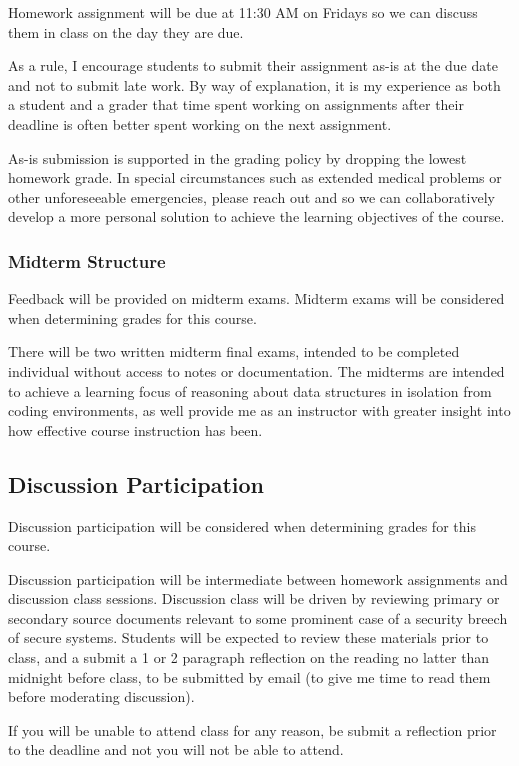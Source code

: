 \documentclass[11pt]{article}
\begin{document}
Homework assignment will be due at 11:30 AM on Fridays so we can discuss them in class on the 
day they are due.

As a rule, I encourage students to submit their assignment as-is at the due date and not to
submit late work. By way of explanation, it is my experience as both a student and a grader that time spent working on assignments after their deadline is often better spent working on the next assignment.

As-is submission is supported in the grading policy by dropping the lowest homework
grade. In special circumstances such as extended medical problems or other unforeseeable
emergencies, please reach out and so we can collaboratively develop a more personal
solution to achieve the learning objectives of the course.

\subsubsection*{Midterm Structure}

Feedback will be provided on midterm exams.  Midterm exams will be considered when determining grades for this course.

There will be two written midterm final exams, intended to be completed individual
without access to notes or documentation. The midterms are intended to achieve a learning
focus of reasoning about data structures in isolation from coding environments,
as well provide me as an instructor with greater insight into how effective course
instruction has been.

\subsection*{Discussion Participation}

Discussion participation will be considered when determining grades for this course.

Discussion participation will be intermediate between homework assignments and discussion class
sessions. Discussion class will be driven by reviewing primary or secondary source documents relevant to some prominent case of a security breech of secure systems. Students will be expected to review these materials prior to class, and a submit a 1 or 2 paragraph reflection on the reading no latter than midnight before class, to be submitted by email (to give me time to read them before moderating discussion).

If you will be unable to attend class for any reason, be submit a reflection prior to the deadline and not you will not be able to attend.
\end{document}
